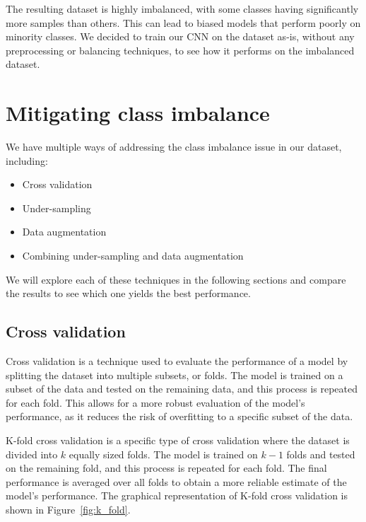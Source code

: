 The resulting dataset is highly imbalanced, with some classes having significantly more samples than others. This can lead to biased models 
that perform poorly on minority classes. We decided to train our CNN on the dataset as-is, without any preprocessing or balancing techniques,
to see how it performs on the imbalanced dataset. 

\section{Mitigating class imbalance}
\label{sec:mitigating_class_imbalance}

We have multiple ways of addressing the class imbalance issue in our dataset, including:
\begin{itemize}
	\item Cross validation
	\item Under-sampling
	\item Data augmentation
	\item Combining under-sampling and data augmentation
\end{itemize}

We will explore each of these techniques in the following sections and compare the results to see which one yields the best performance.

\subsection{Cross validation}
\label{subsec:cross_validation}

Cross validation is a technique used to evaluate the performance of a model by splitting the dataset into multiple subsets, or folds.
The model is trained on a subset of the data and tested on the remaining data, and this process is repeated for each fold. 
This allows for a more robust evaluation of the model's performance, as it reduces the risk of overfitting to a specific subset of the data.
\label{subsubsec:k_fold_cross_validation}

K-fold cross validation is a specific type of cross validation where the dataset is divided into $k$ equally sized folds. The model is trained 
on $k-1$ folds and tested on the remaining fold, and this process is repeated for each fold. The final performance is averaged over all folds 
to obtain a more reliable estimate of the model's performance. The graphical representation of K-fold cross validation is shown in Figure~\ref{fig:k_fold}.

